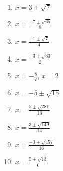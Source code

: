 \begin{enumerate}
	\item $x = 3 \pm \sqrt{7}$
	\item $x = \frac{-7 \pm \sqrt{65}}{8}$
    \item $x = \frac{-1 \pm \sqrt{7}}{4}$
    \item $x = \frac{-3 \pm \sqrt{33}}{2}$
    \item $x = -\frac{8}{7}$, $x = 2$
    \item $x = -5 \pm \sqrt{15}$
    \item $x = \frac{5 \pm \sqrt{281}}{16}$
    \item $x = \frac{3 \pm \sqrt{149}}{14}$
    \item $x = \frac{-3 \pm \sqrt{457}}{16}$
    \item $x = \frac{5 \pm \sqrt{13}}{6}$
\end{enumerate}
